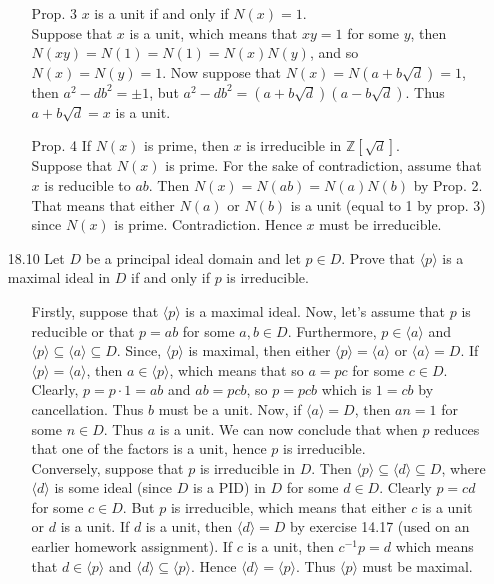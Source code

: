 \documentclass[12pt]{article}
\begin{document}
\begin{enumerate}
\begin{enumerate}
\item[Prop. 3] $x$ is a unit if and only if $N(x) = 1$. \\
Suppose that $x$ is a unit, which means that $xy = 1$ for some $y$, 
then $N(xy) = N(1) = N(1) = N(x)N(y)$, and so $N(x) = N(y) = 1$. 
Now suppose that $N(x) = N(a + b\sqrt{d}) = 1$, then $a^2 - db^2 = \pm 1$, but $ a^2 - db^2 = (a + b\sqrt{d})(a - b\sqrt{d})$.
Thus $a + b\sqrt{d} = x$ is a unit.

\item[Prop. 4] If $N(x)$ is prime, then $x$ is irreducible in $\mathbb{Z}[\sqrt{d}]$. \\
Suppose that $N(x)$ is prime. For the sake of contradiction, assume that $x$ is reducible to $ab$.
Then $N(x) = N(ab) = N(a)N(b)$ by Prop. 2. That means that either $N(a)$ or $N(b)$ is a unit (equal to 1 by 
prop. 3) since $N(x)$ is prime. Contradiction. Hence $x$ must be irreducible.
\end{enumerate}

\item[18.10] Let $D$ be a principal ideal domain and let $p \in D$. Prove that $\langle p
\rangle$ is a maximal ideal in $D$ if and only if $p$ is irreducible.
\begin{enumerate}
\item[] Firstly, suppose that $\langle p\rangle$ is a maximal ideal. Now, let's assume
that $p$ is reducible or that $p = ab$ for some $a, b \in D$. Furthermore, $p \in \langle a\rangle$ and
$\langle p\rangle \subseteq \langle a\rangle \subseteq D$. Since, $\langle p\rangle$ is maximal, then
either $\langle p\rangle = \langle a\rangle$ or $\langle a\rangle = D$.
If $\langle p\rangle = \langle a\rangle$, then $a \in \langle p\rangle$, which means that so $a = pc$ for some
$c \in D$. Clearly, $p = p \cdot 1 = ab$ and $ab = pcb$, so $p = pcb$ which is $1 = cb$ by cancellation. Thus $b$ must be 
a unit. Now, if $\langle a\rangle = D$, then $an = 1$ for some $n \in D$. Thus $a$ is a unit. We can now conclude that
when $p$ reduces that one of the factors is a unit, hence $p$ is irreducible.\\
Conversely, suppose that $p$ is irreducible in $D$. Then $\langle p\rangle \subseteq \langle d\rangle \subseteq D$, 
where $\langle d\rangle$ is some ideal (since $D$ is a PID) in $D$ for some $d \in D$. 
Clearly $p = cd$ for  some $c \in D$. But $p$ is irreducible, which means that either $c$ is a unit or $d$ is a unit.
If $d$ is a unit, then $\langle d\rangle = D$ by exercise 14.17 (used on an earlier homework assignment). If $c$ is a unit,
then $c^{-1}p = d$ which means that $d \in \langle p\rangle$ and $\langle d\rangle \subseteq \langle p\rangle$. Hence
$\langle d\rangle = \langle p\rangle$. Thus $\langle p\rangle$ must be maximal.
\end{enumerate}


\end{enumerate}
\end{document}
